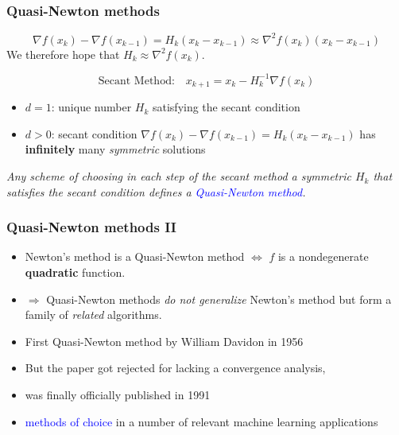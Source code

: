\documentclass[aspectratio=149]{beamer}
\begin{document}
\begin{frame}
  \frametitle{Quasi-Newton methods}

  \begin{equation}
    \nabla f(x_k) - \nabla f(x_{k-1}) = H_k (x_k - x_{k-1}) \approx \nabla^2 f(x_k) (x_k - x_{k-1})
  \end{equation}
  We therefore hope that $H_k \approx \nabla^2 f(x_k)$.

  \begin{equation}
    \text{Secant Method:} \quad x_{k+1} = x_k - H_k^{-1} \nabla f(x_k)
  \end{equation}

  \begin{itemize}
    \item $d=1$: unique number $H_k$ satisfying the secant condition
    \item $d>0$: secant condition $\nabla f(x_k) - \nabla f(x_{k-1}) = H_k (x_k - x_{k-1})$ has \textbf{infinitely} many \textit{symmetric} solutions
  \end{itemize}

  \begin{block}{}
    \textit{Any scheme of choosing in each step of the secant method a symmetric $H_k$ that satisfies the secant condition defines a \textcolor{blue}{Quasi-Newton method}.}
  \end{block}


\end{frame}

\begin{frame}
  \frametitle{Quasi-Newton methods II}

  \begin{itemize}
    \item Newton’s method is a Quasi-Newton method $\Leftrightarrow$
          $f$ is a nondegenerate \textbf{quadratic} function.
    \item $\Rightarrow$ Quasi-Newton methods \textit{do not generalize} Newton’s method but form a
          family of \textit{related} algorithms.
    \item First Quasi-Newton method by William Davidon in 1956
    \item But the paper got rejected for lacking a convergence analysis,
    \item was finally officially published in 1991
    \item \textcolor{blue}{methods of choice} in a number of relevant machine learning applications
  \end{itemize}

\end{frame}
\end{document}
